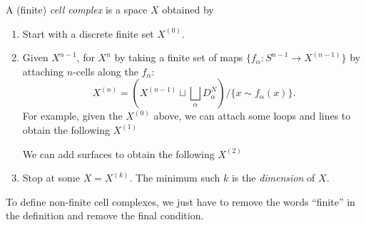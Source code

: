 \documentclass[a4paper]{article}
\begin{document}
\begin{defi}
  A (finite) \emph{cell complex} is a space $X$ obtained by
  \begin{enumerate}
    \item Start with a discrete finite set $X^{(0)}$.
      \begin{center}
      \end{center}
    \item Given $X^{n - 1}$, for $X^n$ by taking a finite set of maps $\{f_\alpha: S^{n - 1} \to X^{(n - 1)}\}$  by attaching $n$-cells along the $f_\alpha$:
      \[
        X^{(n)} = \left(X^{(n - 1)}\sqcup \bigsqcup_\alpha D_{\alpha}^N\right)/\{x\sim f_\alpha(x)\}.
      \]
      For example, given the $X^{(0)}$ above, we can attach some loops and lines to obtain the following $X^{(1)}$
      \begin{center}
      \end{center}
      We can add surfaces to obtain the following $X^{(2)}$
      \begin{center}
      \end{center}
    \item Stop at some $X = X^{(k)}$. The minimum such $k$ is the \emph{dimension} of $X$.
  \end{enumerate}
  To define non-finite cell complexes, we just have to remove the words ``finite'' in the definition and remove the final condition.
\end{defi}
\end{document}
